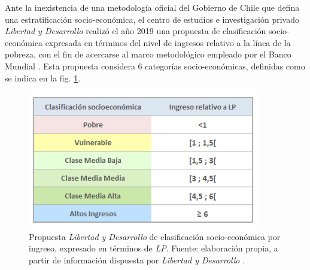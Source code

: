 \documentclass[12pt,letterpaper,spanish]{article}
\begin{document}
Ante la inexistencia de una metodología oficial del Gobierno de Chile que defina una estratificación socio-económica, el centro de estudios e investigación privado \textit{Libertad y Desarrollo} realizó el año 2019 una propuesta de clasificación socio-económica expresada en términos del nivel de ingresos relativo a la línea de la pobreza, con el fin de acercarse al marco metodológico empleado por el Banco Mundial \cite{LibertadyDesarrollo2019HaciaChile}. Esta propuesta considera 6 categorías socio-económicas, definidas como se indica en la fig. \ref{clasld}.


\begin{figure}[H]
    \centering
    \includegraphics[height=6cm]{Max/clasificacion_ld.png}
    \caption{Propuesta \textit{Libertad y Desarrollo} de clasificación socio-económica por ingreso, expresado en términos de \textit{LP}. Fuente: elaboración propia, a partir de información dispuesta por \textit{Libertad y Desarrollo} \cite{LibertadyDesarrollo2019HaciaChile}. }
    \label{clasld}
\end{figure}
\end{document}
